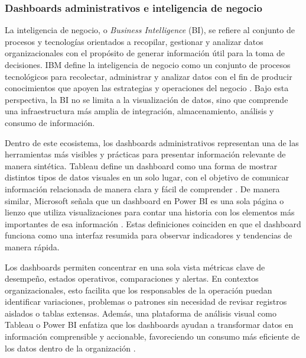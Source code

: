 \documentclass[12pt]{report}
\begin{document}
\subsubsection{Dashboards administrativos e inteligencia de negocio}

La inteligencia de negocio, o \textit{Business Intelligence} (BI), se refiere al conjunto de procesos y tecnologías orientados a recopilar, gestionar y analizar datos organizacionales con el propósito de generar información útil para la toma de decisiones. IBM define la inteligencia de negocio como un conjunto de procesos tecnológicos para recolectar, administrar y analizar datos con el fin de producir conocimientos que apoyen las estrategias y operaciones del negocio \cite{ibm_bi_2025}. Bajo esta perspectiva, la BI no se limita a la visualización de datos, sino que comprende una infraestructura más amplia de integración, almacenamiento, análisis y consumo de información.

Dentro de este ecosistema, los dashboards administrativos representan una de las herramientas más visibles y prácticas para presentar información relevante de manera sintética. Tableau define un dashboard como una forma de mostrar distintos tipos de datos visuales en un solo lugar, con el objetivo de comunicar información relacionada de manera clara y fácil de comprender \cite{tableau_dashboard_overview_2026}. De manera similar, Microsoft señala que un dashboard en Power BI es una sola página o lienzo que utiliza visualizaciones para contar una historia con los elementos más importantes de esa información \cite{powerbi_dashboards_2025,powerbi_dashboards_users_2025}. Estas definiciones coinciden en que el dashboard funciona como una interfaz resumida para observar indicadores y tendencias de manera rápida.

Los dashboards permiten concentrar en una sola vista métricas clave de desempeño, estados operativos, comparaciones y alertas. En contextos organizacionales, esto facilita que los responsables de la operación puedan identificar variaciones, problemas o patrones sin necesidad de revisar registros aislados o tablas extensas. Además, una plataforma de análisis visual como Tableau o Power BI enfatiza que los dashboards ayudan a transformar datos en información comprensible y accionable, favoreciendo un consumo más eficiente de los datos dentro de la organización \cite{tableau_what_is_tableau_2026,powerbi_overview_2025}.
\end{document}
